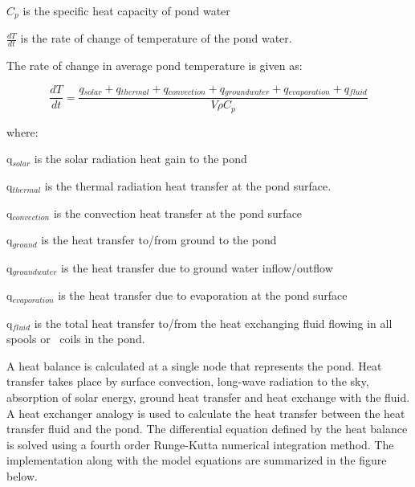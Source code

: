 \(C{}_p\) is the specific heat capacity of pond water

\(\frac{{dT}}{{dt}}\) is the  rate of change of temperature of the pond water.

The rate of change in average pond temperature is given as:

\begin{equation}
\frac{{dT}}{{dt}} = \frac{{q{}_{solar} + q{}_{thermal} + q{}_{convection} + q{}_{groundwater} + q{}_{evaporation} + q{}_{fluid}}}{{V\rho C{}_p}}
\end{equation}

where:

q\(_{solar}\) is the solar radiation heat gain to the pond

q\(_{thermal}\) is the thermal radiation heat transfer at the pond surface.

q\(_{convection}\) is the convection heat transfer at the pond surface

q\(_{ground}\) is the heat transfer to/from ground to the pond

q\(_{groundwater}\) is the heat transfer due to ground water inflow/outflow

q\(_{evaporation}\) is the heat transfer due to evaporation at the pond surface

q\(_{fluid}\) is the total heat transfer to/from the heat exchanging fluid flowing in all spools or~ coils in the pond.

A heat balance is calculated at a single node that represents the pond. Heat transfer takes place by surface convection, long-wave radiation to the sky, absorption of solar energy, ground heat transfer and heat exchange with the fluid. A heat exchanger analogy is used to calculate the heat transfer between the heat transfer fluid and the pond. The differential equation defined by the heat balance is solved using a fourth order Runge-Kutta numerical integration method. The implementation along with the model equations are summarized in the figure below.

